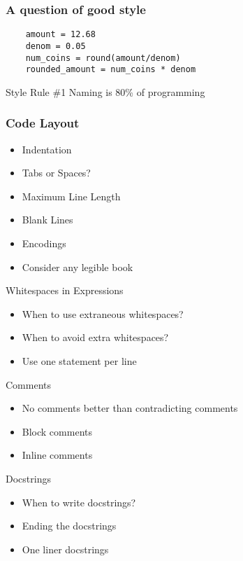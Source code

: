 \documentclass[compress,14pt]{beamer}
\begin{document}
\begin{frame}[fragile] \frametitle{A question of good style}
  \begin{lstlisting}
    amount = 12.68
    denom = 0.05
    num_coins = round(amount/denom)
    rounded_amount = num_coins * denom
  \end{lstlisting}
  \pause
  \begin{block}{Style Rule \#1}
    Naming is 80\% of programming
  \end{block}
\end{frame}

\begin{frame}[fragile]
  \frametitle{Code Layout}
  \begin{itemize}
        \item Indentation
        \item Tabs or Spaces?
        \item Maximum Line Length
        \item Blank Lines
        \item Encodings
        \item Consider any legible book
   \end{itemize}
\end{frame}

\begin{frame}{Whitespaces in Expressions}
  \begin{itemize}
        \item When to use extraneous whitespaces?
        \item When to avoid extra whitespaces?
        \item Use one statement per line
   \end{itemize}
\end{frame}

\begin{frame}{Comments}
  \begin{itemize}
        \item No comments better than contradicting comments
        \item Block comments
        \item Inline comments
   \end{itemize}
\end{frame}

\begin{frame}{Docstrings}
  \begin{itemize}
        \item When to write docstrings?
        \item Ending the docstrings
        \item One liner docstrings
   \end{itemize}
\end{frame}
\end{document}
